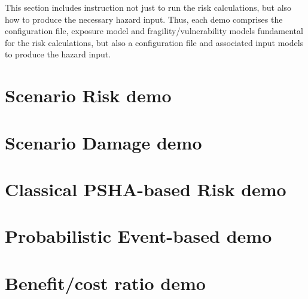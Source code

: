 This section includes instruction not just to run the risk calculations, but also how to produce the necessary hazard input. Thus, each demo comprises the configuration file, exposure model and fragility/vulnerability models fundamental for the risk calculations, but also a configuration file and associated input models to produce the hazard input.

\section{Scenario Risk demo}

\section{Scenario Damage demo}

\section{Classical PSHA-based Risk demo}

\section{Probabilistic Event-based demo}

\section{Benefit/cost ratio demo}
